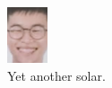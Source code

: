 \documentclass{article}
\begin{document}
\begin{figure}[ht!]
\begin{subfigure}[b]{0.3\linewidth}
\includegraphics[width=\linewidth]{images/solar.png}
\caption{Yet another solar.}
\end{subfigure}
\begin{subfigure}[b]{0.5\linewidth}

\end{subfigure}
\end{figure}
\end{document}
